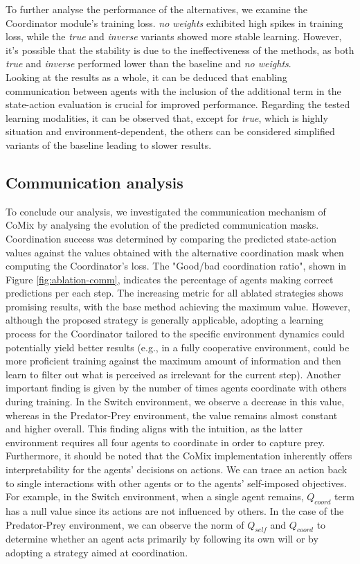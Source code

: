 \documentclass[a4paper,singleside,12pt]{report} %
\begin{document}
To further analyse the performance of the alternatives, we examine the Coordinator module's training loss. \textit{no weights} exhibited high spikes in training loss, while the \textit{true} and \textit{inverse} variants showed more stable learning. However, it's possible that the stability is due to the ineffectiveness of the methods, as both \textit{true} and \textit{inverse} performed lower than the baseline and \textit{no weights}.\\
Looking at the results as a whole, it can be deduced that enabling communication between agents with the inclusion of the additional term in the state-action evaluation is crucial for improved performance. Regarding the tested learning modalities, it can be observed that, except for \textit{true}, which is highly situation and environment-dependent, the others can be considered simplified variants of the baseline leading to slower results.

\subsection{Communication analysis}\label{comm-analysis}
To conclude our analysis, we investigated the communication mechanism of CoMix by analysing the evolution of the predicted communication masks. Coordination success was determined by comparing the predicted state-action values against the values obtained with the alternative coordination mask when computing the Coordinator's loss. The "Good/bad coordination ratio", shown in Figure \ref{fig:ablation-comm}, indicates the percentage of agents making correct predictions per each step. The increasing metric for all ablated strategies shows promising results, with the base method achieving the maximum value. However, although the proposed strategy is generally applicable, adopting a learning process for the Coordinator tailored to the specific environment dynamics could potentially yield better results (e.g., in a fully cooperative environment, could be more proficient training against the maximum amount of information and then learn to filter out what is perceived as irrelevant for the current step). Another important finding is given by the number of times agents coordinate with others during training. In the Switch environment, we observe a decrease in this value, whereas in the Predator-Prey environment, the value remains almost constant and higher overall. This finding aligns with the intuition, as the latter environment requires all four agents to coordinate in order to capture prey.\\
Furthermore, it should be noted that the CoMix implementation inherently offers interpretability for the agents' decisions on actions. We can trace an action back to single interactions with other agents or to the agents' self-imposed objectives. For example, in the Switch environment, when a single agent remains, $Q_{coord}$ term has a null value since its actions are not influenced by others. In the case of the Predator-Prey environment, we can observe the norm of $Q_{self}$ and $Q_{coord}$ to determine whether an agent acts primarily by following its own will or by adopting a strategy aimed at coordination.
\end{document}
